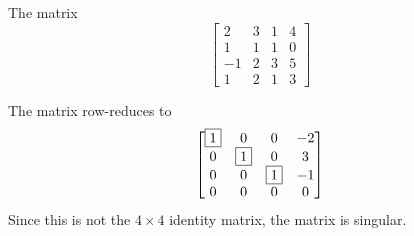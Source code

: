 \documentclass{ximera}
\author{Rob Beezer}
\begin{document}
\begin{exercise}
  The matrix
  \[
    \begin{bmatrix}
      2 & 3 & 1 & 4\\
      1 & 1 & 1 & 0\\
      -1 & 2 & 3 & 5\\
      1 & 2 & 1 & 3
    \end{bmatrix}
  \]
  \begin{multipleChoice}
  \end{multipleChoice}

  \begin{feedback}[correct]
    The matrix row-reduces to
    \[
      \begin{bmatrix}
        \fbox{1} & 0 & 0 & -2\\
        0 & \fbox{1} & 0 & 3\\
        0 & 0 & \fbox{1} & -1\\
        0 & 0 & 0 & 0
      \end{bmatrix}
    \]
    Since this is not the $4\times 4$ identity matrix, the matrix is singular.
  \end{feedback}
\end{exercise}
\end{document}
